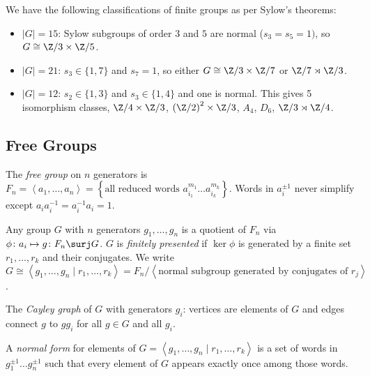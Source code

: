 \documentclass{notes}
\begin{document}
\begin{example}
    We have the following classifications of finite groups as per Sylow's theorems:
    \begin{itemize}
        \item $|G|=15$: Sylow subgroups of order $3$ and $5$ are normal ($s_3=s_5=1)$, so $G\cong \Z /3\times \Z /5$.
        \item $|G|=21$: $s_3\in \{1,7\}$ and $s_7=1$, so either $G\cong \Z /3\times \Z /7$ or $\Z /7\rtimes \Z /3$.
        \item $|G|=12$: $s_2\in \{1,3\}$ and $s_3\in \{1,4\}$ and one is normal. This gives 5 isomorphism classes, $\Z /4\times \Z /3$, $\left( \Z /2 \right) ^2 \times \Z /3$, $A_4$, $D_6$, $\Z /3\rtimes \Z /4$.
    \end{itemize}
\end{example}

\subsection{Free Groups}

\begin{defn}
    The \emph{free group}  on  $n$ generators is $F_n=\left\langle {a}_{1},\ldots,{a}_{n}  \right\rangle=\left\{ \text{all reduced words } a_{i_1}^{m_1}\ldots a_{i_k}^{m_k} \right\} $. Words in $a_i^{\pm 1}$ never simplify except $a_ia_i^{-1}=a_i^{-1}a_i=1$.
\end{defn}

\begin{theorem}
    Any group $G$ with $n$ generators ${g}_{1},\ldots,{g}_{n} $ is a quotient of $F_n$ via $\phi \colon a_i\mapsto g\colon F_n\surj G$. $G$ is \emph{finitely presented} if $\ker \phi $ is generated by a finite set ${r}_{1},\ldots,{r}_{k} $ and their conjugates. We write $G\cong \left\langle {g}_{1},\ldots,{g}_{n} \mid  {r}_{1},\ldots,{r}_{k}  \right\rangle=F_n/\left\langle \text{normal subgroup generated by conjugates of $r_j$} \right\rangle$.
\end{theorem}

\begin{defn}
    The \emph{Cayley graph} of $G$ with generators $g_i$: vertices are elements of $G$ and edges connect $g$ to $gg_i$ for all $g\in G$ and all $g_i$.
\end{defn}

\begin{defn}
    A \emph{normal form} for elements of $G=\left\langle {g}_{1},\ldots,{g}_{n} \mid  {r}_{1},\ldots,{r}_{k}  \right\rangle$ is a set of words in $g_1 ^{\pm 1}\ldots g_n^{\pm 1}$ such that every element of $G$ appears exactly once among those words.
\end{defn}
\end{document}
